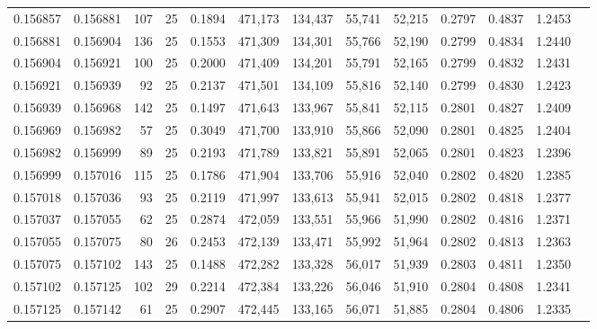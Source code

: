 \begin{tabular}{rrrrrrrrrrrrr}
0.156857 & 0.156881 &   107 &  25 &                                     0.1894 & 471,173 & 134,437 &  55,741 &  52,215 & 0.2797 & 0.4837 & 1.2453 \\
0.156881 & 0.156904 &   136 &  25 &                                     0.1553 & 471,309 & 134,301 &  55,766 &  52,190 & 0.2799 & 0.4834 & 1.2440 \\
0.156904 & 0.156921 &   100 &  25 &                                     0.2000 & 471,409 & 134,201 &  55,791 &  52,165 & 0.2799 & 0.4832 & 1.2431 \\
0.156921 & 0.156939 &    92 &  25 &                                     0.2137 & 471,501 & 134,109 &  55,816 &  52,140 & 0.2799 & 0.4830 & 1.2423 \\
0.156939 & 0.156968 &   142 &  25 &                                     0.1497 & 471,643 & 133,967 &  55,841 &  52,115 & 0.2801 & 0.4827 & 1.2409 \\
0.156969 & 0.156982 &    57 &  25 &                                     0.3049 & 471,700 & 133,910 &  55,866 &  52,090 & 0.2801 & 0.4825 & 1.2404 \\
0.156982 & 0.156999 &    89 &  25 &                                     0.2193 & 471,789 & 133,821 &  55,891 &  52,065 & 0.2801 & 0.4823 & 1.2396 \\
0.156999 & 0.157016 &   115 &  25 &                                     0.1786 & 471,904 & 133,706 &  55,916 &  52,040 & 0.2802 & 0.4820 & 1.2385 \\
0.157018 & 0.157036 &    93 &  25 &                                     0.2119 & 471,997 & 133,613 &  55,941 &  52,015 & 0.2802 & 0.4818 & 1.2377 \\
0.157037 & 0.157055 &    62 &  25 &                                     0.2874 & 472,059 & 133,551 &  55,966 &  51,990 & 0.2802 & 0.4816 & 1.2371 \\
0.157055 & 0.157075 &    80 &  26 &                                     0.2453 & 472,139 & 133,471 &  55,992 &  51,964 & 0.2802 & 0.4813 & 1.2363 \\
0.157075 & 0.157102 &   143 &  25 &                                     0.1488 & 472,282 & 133,328 &  56,017 &  51,939 & 0.2803 & 0.4811 & 1.2350 \\
0.157102 & 0.157125 &   102 &  29 &                                     0.2214 & 472,384 & 133,226 &  56,046 &  51,910 & 0.2804 & 0.4808 & 1.2341 \\
0.157125 & 0.157142 &    61 &  25 &                                     0.2907 & 472,445 & 133,165 &  56,071 &  51,885 & 0.2804 & 0.4806 & 1.2335 \\

\end{tabular}
